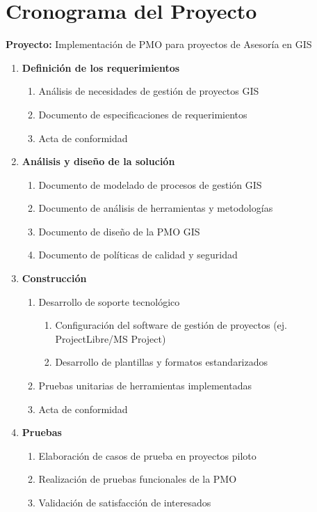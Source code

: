 \section*{Cronograma del Proyecto}

\textbf{Proyecto:} Implementación de PMO para proyectos de Asesoría en GIS

\begin{enumerate}
  \item \textbf{Definición de los requerimientos}
  \begin{enumerate}
    \item Análisis de necesidades de gestión de proyectos GIS
    \item Documento de especificaciones de requerimientos
    \item Acta de conformidad
  \end{enumerate}
  \item \textbf{Análisis y diseño de la solución}
  \begin{enumerate}
    \item Documento de modelado de procesos de gestión GIS
    \item Documento de análisis de herramientas y metodologías
    \item Documento de diseño de la PMO GIS
    \item Documento de políticas de calidad y seguridad
  \end{enumerate}
  \item \textbf{Construcción}
  \begin{enumerate}
    \item Desarrollo de soporte tecnológico
    \begin{enumerate}
      \item Configuración del software de gestión de proyectos (ej. ProjectLibre/MS Project)
      \item Desarrollo de plantillas y formatos estandarizados
    \end{enumerate}
    \item Pruebas unitarias de herramientas implementadas
    \item Acta de conformidad
  \end{enumerate}
  \item \textbf{Pruebas}
  \begin{enumerate}
    \item Elaboración de casos de prueba en proyectos piloto
    \item Realización de pruebas funcionales de la PMO
    \item Validación de satisfacción de interesados

\end{enumerate}
\end{enumerate}
